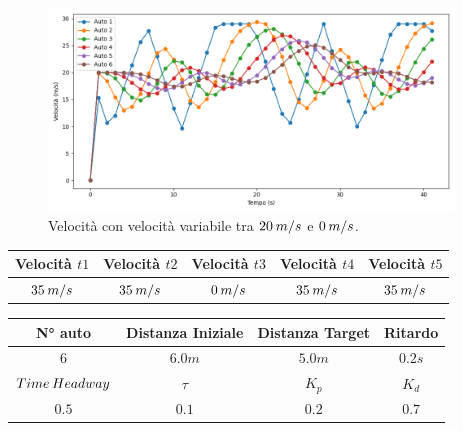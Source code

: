 \begin{figure}[H]
    \includegraphics[width=0.96\textwidth]{images/5-experiment/velocity/velocity_20-0-20-0-20.png}
    \caption{Velocità con velocità variabile tra $20\hspace{0.2em}m/s$ e $0\hspace{0.2em}m/s$.}
    \label{fig:20-0-variabvelocity-velocity}
\end{figure}

\newpage

\begin{table}[h]
    \centering
    \begin{tabular}{|c|c|c|c|c|}
        \hline
        Velocità $t1$ & Velocità $t2$ & Velocità $t3$ &Velocità $t4$ &Velocità $t5$\\
        \hline
            $35\hspace{0.2em}m/s$ & $35\hspace{0.2em}m/s$ & $0\hspace{0.2em}m/s$ & $35\hspace{0.2em}m/s$ & $35\hspace{0.2em}m/s$ \\
        \hline
    \end{tabular}
\end{table}
\begin{table}[h]
    \centering
    \begin{tabular}{|c|c|c|c|}
        \hline
        N° auto & Distanza Iniziale & Distanza Target & Ritardo \\
        \hline
        $6$ & $6.0 m$ & $5.0 m$ & $0.2 s$ \\
        \hline
        $Time\hspace{0.2em}Headway$ & $\tau$ & $K_p$ & $K_d$  \\
        \hline
        $0.5$ & $0.1$ & $0.2$ & $0.7$ \\
        \hline
    \end{tabular}
\end{table}

